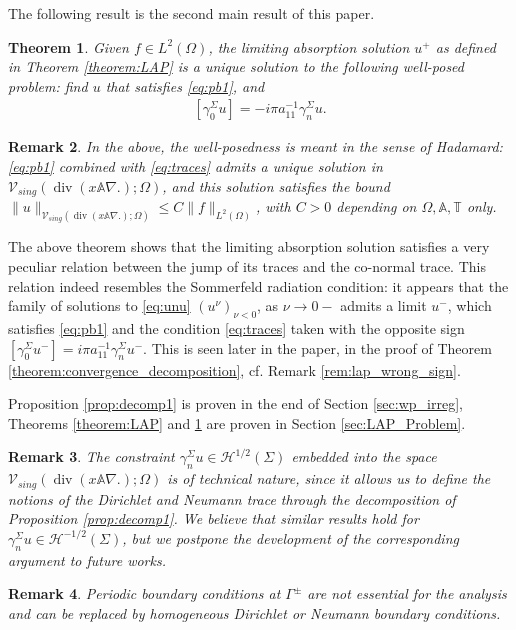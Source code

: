 \documentclass[report]{elsarticle}
\newtheorem{theorem}{Theorem}[section]
\newtheorem{remark}[theorem]{Remark}
\numberwithin{theorem}{section}
\begin{document}
The following result is the second main result of this paper. 
\begin{theorem}
	\label{theorem:main_result}
	Given $f\in L^2(\Omega)$, the limiting absorption solution $u^+$ as defined in Theorem \ref{theorem:LAP} is a unique solution to the following well-posed problem: find $u$ that satisfies \eqref{eq:pb1},  and 
	\begin{align}
		\label{eq:traces}
		[\gamma_0^{\Sigma}u]=-i\pi a_{11}^{-1}\gamma_n^{\Sigma}u.
	\end{align}
\end{theorem}
\begin{remark}
	\label{rem:wp}
	In the above, the well-posedness is meant in the sense of Hadamard: \eqref{eq:pb1} combined with \eqref{eq:traces} admits a unique solution in $\mathcal{V}_{sing}(\operatorname{div}(x\mathbb{A}\nabla .); \Omega)$, and this solution satisfies the bound $\|u\|_{\mathcal{V}_{sing}(\operatorname{div}(x\mathbb{A}\nabla.); \Omega)}\leq C\|f\|_{L^2(\Omega)}$, with $C>0$ depending on $\Omega, \mathbb{A}, \mathbb{T}$ only.
\end{remark}
The above theorem shows that the limiting absorption solution satisfies a very peculiar relation between the jump of its traces and the co-normal trace. This relation indeed resembles the Sommerfeld radiation condition: it appears that the family of solutions to \eqref{eq:unu}  $(u^{\nu})_{\nu<0}$, as $\nu\rightarrow 0-$ admits a limit $u^{-}$, which satisfies \eqref{eq:pb1} and the condition \eqref{eq:traces} taken with the opposite sign $[\gamma_0^{\Sigma}u^{-}]=i\pi a_{11}^{-1}\gamma_n^{\Sigma}u^{-}$. This is seen later in the paper, in the proof of Theorem \ref{theorem:convergence_decomposition}, cf. Remark \ref{rem:lap_wrong_sign}. 

Proposition \ref{prop:decomp1} is proven in the end of Section \ref{sec:wp_irreg}, Theorems \ref{theorem:LAP} and \ref{theorem:main_result} are proven in Section \ref{sec:LAP_Problem}.
\begin{remark}
	The constraint $\gamma_n^{\Sigma}u\in \mathcal{H}^{1/2}(\Sigma)$ embedded into the space $\mathcal{V}_{sing}(\operatorname{div}(x\mathbb{A}\nabla.);\Omega)$ is of technical nature, since it allows us to define the notions of the Dirichlet and Neumann trace through the decomposition of Proposition \ref{prop:decomp1}. We believe that similar results hold for $\gamma_n^{\Sigma}u\in \mathcal{H}^{-1/2}(\Sigma)$, but we postpone the development of the corresponding argument to future works. 
\end{remark}
\begin{remark}
	\label{remark:periodicBCs}
	Periodic boundary conditions at $\Gamma^{\pm}$ are not essential for the analysis and can be replaced by homogeneous Dirichlet or Neumann boundary conditions.
\end{remark}
\end{document}
